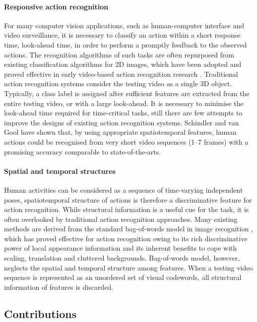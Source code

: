 \paragraph{Responsive action recognition}  For many computer vision applications, such as human-computer interface and video surveillance, it is necessary to classify an action within a short response time, \ie look-ahead time, in order to perform a promptly feedback to the observed actions.  The recognition algorithms of such tasks are often repurposed from existing classification algorithms for 2D images, which have been adopted and proved effective in early video-based action recognition research \cite{Schuldt2004, Dollar2005}.  Traditional action recognition systems consider the testing video as a single 3D object. Typically, a class label is assigned after sufficient features are extracted from the entire testing video, or with a large look-ahead. It is necessary to minimise the look-ahead time required for time-critical tasks, still there are few attempts to improve the designs of existing action recognition systems. Schindler and van Gool \cite{Schindler2008} have shown that, by using appropriate spatiotemporal features, human actions could be recognised from very short video sequences (1--7 frames) with a promising accuracy comparable to state-of-the-arts.

\paragraph{Spatial and temporal structures}
Human activities can be considered as a sequence of time-varying independent poses, spatiotemporal structure of actions is therefore a discriminative feature for action recognition.  
While structural information is a useful cue for the task, it is often overlooked by traditional action recognition approaches.  
Many existing methods are derived from the standard bag-of-words model in image recognition \cite{Sivic2005, Fei-Fei2005}, which has proved effective for action recognition owing to its rich discriminative power of local appearance information and its inherent benefits to cope with scaling, translation and cluttered backgrounds. 
Bag-of-words model, however, neglects the spatial and temporal structure among features. 
When a testing video sequence is represented as an unordered set of visual codewords, all structural information of features is discarded. 

\subsection{Contributions}

